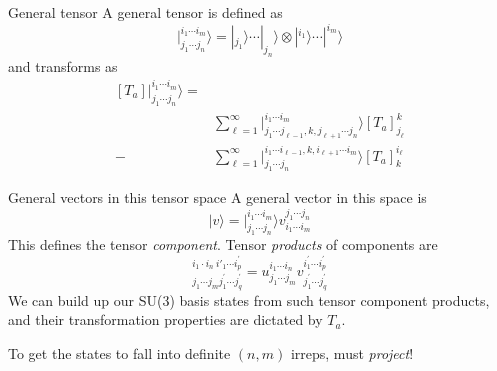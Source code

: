 \documentclass{beamer}
\begin{document}
\begin{frame}{General tensor}
\footnotesize
A general tensor is defined as
\begin{displaymath}
\left.\right| _ { j _ { 1 } \cdots j _ { n } } ^ { i _ { 1 } \cdots i _ { m } } \rangle =|_{j_1}\rangle\cdots|_{j_n}\rangle\otimes
|^{i_1}\rangle\cdots|^{i_m}\rangle
\end{displaymath}
and transforms as
\begin{align*}
\left[ T _ { a } \right]\left.\right| _ { j _ { 1 } \cdots j _ { n } } ^ { i _ { 1 } \cdots i _ { m } } \rangle =&\\
& \sum _ { \ell = 1 } ^ { \infty }\left.\right| _ { j _ { 1 } \cdots j_{\ell-1}, k,  j_{\ell+1}\cdots j _ { n } } ^ { i _ { 1 } \cdots i _ { m } } \rangle 
\left[ T _ { a } \right] _ { j _ { \ell } } ^ { k } \\
-&\sum _ { \ell = 1 } ^ { \infty }\left.\right| _ { j _ { 1 } \cdots j _ { n } } ^ { i _ { 1 } \cdots i_{\ell-1}, k,  i_{\ell+1}\cdots i _ { m } } \rangle 
\left[ T _ { a } \right] _ { k } ^ { i_\ell }
\end{align*}
\end{frame}

\begin{frame}{General vectors in this tensor space}
\footnotesize
A general vector in this space is
\begin{displaymath}
| v \rangle =\left.\right| _ { j _ { 1 } \cdots j _ { n } } ^ { i _ { 1 } \cdots i _ { m } } \rangle v _ { i _ { 1 } \cdots i _ { m } } ^ { j _ { 1 } \cdots j _ { n } }
\end{displaymath}
This defines the tensor \emph{component}.  Tensor \emph{products} of components are
\begin{displaymath}
[ u \otimes v ] _ { j _ { 1 } \cdots j _ { m } j _ { 1 } ^ { \prime } \cdots j _ { q } ^ { \prime } } ^ { i _ { 1 } \cdot i_n\ i'_1 \cdots i_ { p } ^ { \prime } } = u _ { j _ { 1 } \cdots j _ { m } } ^ { i _ { 1 } \cdots i _ { n } } v _ { j _ { 1 } ^ { \prime } \cdots j _ { q } ^ { \prime } } ^ { i _ { 1 } ^ { \prime } \cdots i _ { p } ^ { \prime } }
\end{displaymath}
We can build up our SU(3) basis states from such tensor component products, and their transformation properties are dictated by $T_a$.  

\begin{alert}{To get the states to fall into definite $(n,m)$ irreps, must \emph{project}!}
\end{alert}
\end{frame}
\end{document}
